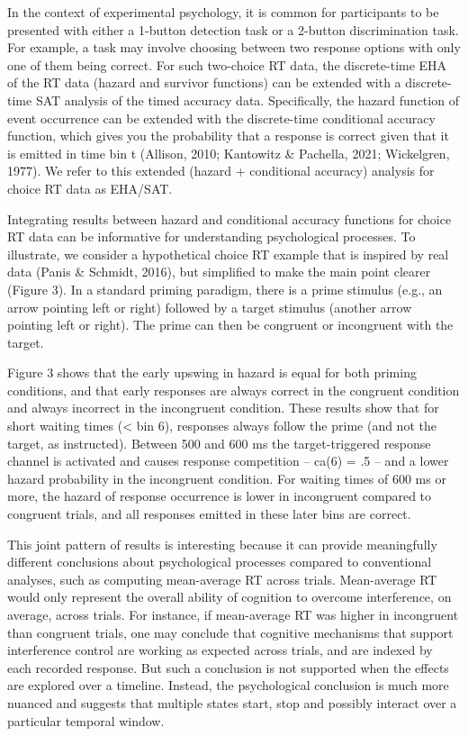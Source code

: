 \documentclass[
  man, donotrepeattitle,floatsintext]{apa6}
\begin{document}
In the context of experimental psychology, it is common for participants to be presented with either a 1-button detection task or a 2-button discrimination task. For example, a task may involve choosing between two response options with only one of them being correct. For such two-choice RT data, the discrete-time EHA of the RT data (hazard and survivor functions) can be extended with a discrete-time SAT analysis of the timed accuracy data. Specifically, the hazard function of event occurrence can be extended with the discrete-time conditional accuracy function, which gives you the probability that a response is correct given that it is emitted in time bin t (Allison, 2010; Kantowitz \& Pachella, 2021; Wickelgren, 1977). We refer to this extended (hazard + conditional accuracy) analysis for choice RT data as EHA/SAT.

Integrating results between hazard and conditional accuracy functions for choice RT data can be informative for understanding psychological processes. To illustrate, we consider a hypothetical choice RT example that is inspired by real data (Panis \& Schmidt, 2016), but simplified to make the main point clearer (Figure 3). In a standard priming paradigm, there is a prime stimulus (e.g., an arrow pointing left or right) followed by a target stimulus (another arrow pointing left or right). The prime can then be congruent or incongruent with the target.

Figure 3 shows that the early upswing in hazard is equal for both priming conditions, and that early responses are always correct in the congruent condition and always incorrect in the incongruent condition. These results show that for short waiting times (\textless{} bin 6), responses always follow the prime (and not the target, as instructed). Between 500 and 600 ms the target-triggered response channel is activated and causes response competition -- ca(6) = .5 -- and a lower hazard probability in the incongruent condition. For waiting times of 600 ms or more, the hazard of response occurrence is lower in incongruent compared to congruent trials, and all responses emitted in these later bins are correct.

This joint pattern of results is interesting because it can provide meaningfully different conclusions about psychological processes compared to conventional analyses, such as computing mean-average RT across trials. Mean-average RT would only represent the overall ability of cognition to overcome interference, on average, across trials. For instance, if mean-average RT was higher in incongruent than congruent trials, one may conclude that cognitive mechanisms that support interference control are working as expected across trials, and are indexed by each recorded response. But such a conclusion is not supported when the effects are explored over a timeline. Instead, the psychological conclusion is much more nuanced and suggests that multiple states start, stop and possibly interact over a particular temporal window.
\end{document}
